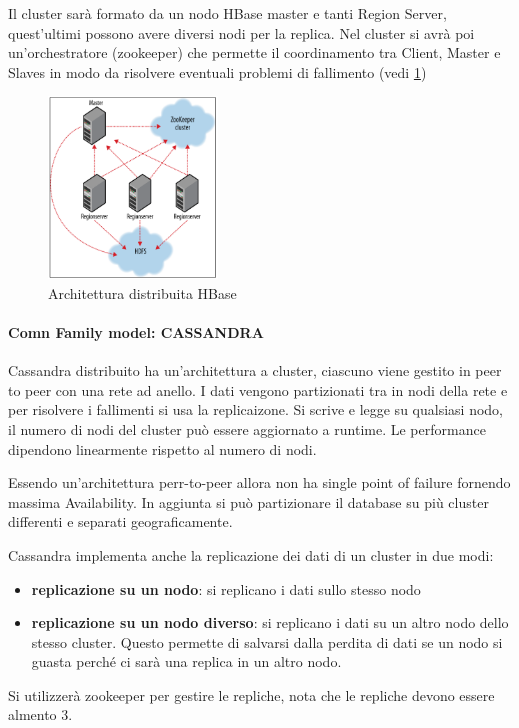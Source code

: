 Il cluster sarà formato da un nodo HBase master e tanti Region Server, quest'ultimi 
possono avere diversi nodi per la replica. Nel cluster si avrà poi un'orchestratore
(zookeeper) che permette il coordinamento tra Client, Master e Slaves in modo da 
risolvere eventuali problemi di fallimento (vedi \ref{fig:dist_hbase})


\begin{figure} [!h]
      \centering
      \includegraphics[width=0.4\textwidth]{img/nosql/hbase_distribuited.png}
      \caption{Architettura distribuita HBase}
      \label{fig:dist_hbase}
\end{figure}

\paragraph{Comn Family model: CASSANDRA}

Cassandra distribuito ha un'architettura a cluster, ciascuno viene gestito in peer 
to peer con una rete ad anello. I dati vengono partizionati tra in nodi della rete e 
per risolvere i fallimenti si usa la replicaizone. Si scrive e legge su 
qualsiasi nodo, il numero di nodi del cluster può essere aggiornato a runtime. 
Le performance dipendono linearmente rispetto al numero di nodi.

Essendo un'architettura perr-to-peer allora non ha single point of failure 
fornendo massima Availability. In aggiunta si può partizionare il database 
su più cluster differenti e separati geograficamente. 

Cassandra implementa anche la replicazione dei dati di un cluster in due modi:
\begin{itemize}
      \item \textbf{replicazione su un nodo}: si replicano i dati sullo stesso nodo
      \item \textbf{replicazione su un nodo diverso}: si replicano i dati su un altro nodo 
      dello stesso cluster. Questo permette di salvarsi dalla perdita di dati se 
      un nodo si guasta perché ci sarà una replica in un altro nodo.
\end{itemize} 
Si utilizzerà zookeeper per gestire le repliche, nota che le repliche devono essere 
almento $3$.

